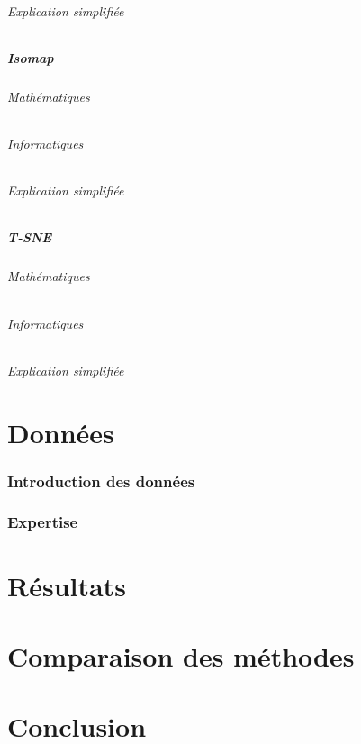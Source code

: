 \documentclass[12pt]{article}
\begin{document}
\paragraph{Explication simplifiée}

\subsubsection{Isomap}

\paragraph{Mathématiques}
\paragraph{Informatiques}
\paragraph{Explication simplifiée}

\subsubsection{T-SNE}

\paragraph{Mathématiques}
\paragraph{Informatiques}
\paragraph{Explication simplifiée}

\newpage
\part{Données}

    \section{Introduction des données}
    

    \section{Expertise}

\newpage
\part{Résultats}

\newpage
\part{Comparaison des méthodes}

\newpage
\part{Conclusion}
\end{document}
